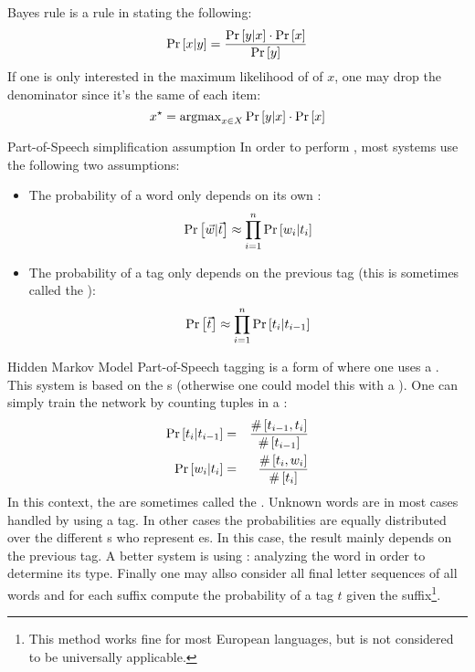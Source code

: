 \begin{tm}{Bayes rule}
\sb{} is a rule in  stating the following:
\begin{equation}
\Pr\left[x|y\right]=\displaystyle\frac{\Pr\left[y|x\right]\cdot\Pr\left[x\right]}{\Pr\left[y\right]}
\end{equation}
If one is only interested in the maximum likelihood of of $x$, one may drop the denominator since it's the same of each item:
\begin{equation}
x^{\star}=\operatorname{argmax}_{x\in X}\Pr\left[y|x\right]\cdot\Pr\left[x\right]
\end{equation}
\end{tm}
\begin{tm}{Part-of-Speech simplification assumption}
In order to perform , most systems use the following two assumptions:
\begin{itemize}
 \item The probability of a word only depends on its own :
 \begin{equation}
  \Pr\left[\vec{w}|\vec{t}\right]\approx\displaystyle\prod_{i=1}^n{\Pr\left[w_i|t_i\right]}
 \end{equation}
 \item The probability of a tag only depends on the previous tag (this is sometimes called the ):
 \begin{equation}
  \Pr\left[\vec{t}\right]\approx\displaystyle\prod_{i=1}^{n}\Pr\left[t_i|t_{i-1}\right]
 \end{equation}
\end{itemize}
\end{tm}
\begin{df}{Hidden Markov Model Part-of-Speech tagging}
\sb{} is a form of  where one uses a . This system is based on the s (otherwise one could model this with a ). One can simply train the network by counting tuples in a :
\begin{eqnarray}
\Pr\left[t_i|t_{i-1}\right]&=&\displaystyle\frac{\#\left[t_{i-1},t_i\right]}{\#\left[t_{i-1}\right]}\\
\Pr\left[w_i|t_i\right]&=&\displaystyle\frac{\#\left[t_i,w_i\right]}{\#\left[t_i\right]}
\end{eqnarray}
In this context, the  are sometimes called the . Unknown words are in most cases handled by using a  tag. In other cases the probabilities are equally distributed over the different s who represent es. In this case, the result mainly depends on the previous tag. A better system is using : analyzing the word in order to determine its type. Finally one may allso consider all final letter sequences of all words and for each suffix compute the probability of a tag $t$ given the suffix\footnote{This method works fine for most European languages, but is not considered to be universally applicable.}.
\end{df}
